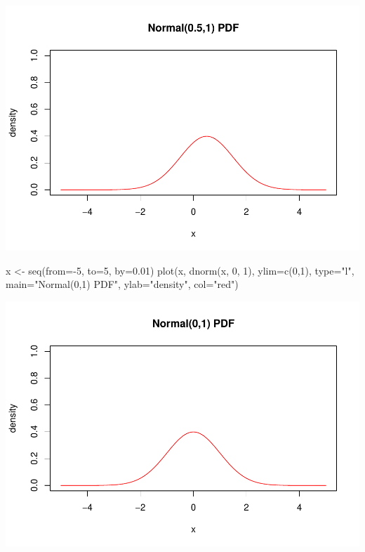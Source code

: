 \documentclass[
]{article}
\newenvironment{Shaded}{\begin{snugshade}}{\end{snugshade}}
\newcommand{\AttributeTok}[1]{\textcolor[rgb]{0.77,0.63,0.00}{#1}}
\newcommand{\DecValTok}[1]{\textcolor[rgb]{0.00,0.00,0.81}{#1}}
\newcommand{\FloatTok}[1]{\textcolor[rgb]{0.00,0.00,0.81}{#1}}
\newcommand{\FunctionTok}[1]{\textcolor[rgb]{0.00,0.00,0.00}{#1}}
\newcommand{\NormalTok}[1]{#1}
\newcommand{\OtherTok}[1]{\textcolor[rgb]{0.56,0.35,0.01}{#1}}
\newcommand{\SpecialCharTok}[1]{\textcolor[rgb]{0.00,0.00,0.00}{#1}}
\newcommand{\StringTok}[1]{\textcolor[rgb]{0.31,0.60,0.02}{#1}}
\begin{document}
\includegraphics{bda_project_files/figure-latex/unnamed-chunk-11-1.pdf}

\begin{Shaded}
\begin{Highlighting}[]
\NormalTok{x }\OtherTok{\textless{}{-}} \FunctionTok{seq}\NormalTok{(}\AttributeTok{from=}\SpecialCharTok{{-}}\DecValTok{5}\NormalTok{, }\AttributeTok{to=}\DecValTok{5}\NormalTok{, }\AttributeTok{by=}\FloatTok{0.01}\NormalTok{)}
\FunctionTok{plot}\NormalTok{(x, }\FunctionTok{dnorm}\NormalTok{(x, }\DecValTok{0}\NormalTok{, }\DecValTok{1}\NormalTok{), }\AttributeTok{ylim=}\FunctionTok{c}\NormalTok{(}\DecValTok{0}\NormalTok{,}\DecValTok{1}\NormalTok{), }\AttributeTok{type=}\StringTok{"l"}\NormalTok{, }\AttributeTok{main=}\StringTok{"Normal(0,1) PDF"}\NormalTok{,}
     \AttributeTok{ylab=}\StringTok{"density"}\NormalTok{, }\AttributeTok{col=}\StringTok{"red"}\NormalTok{)}
\end{Highlighting}
\end{Shaded}

\includegraphics{bda_project_files/figure-latex/unnamed-chunk-12-1.pdf}
\end{document}
